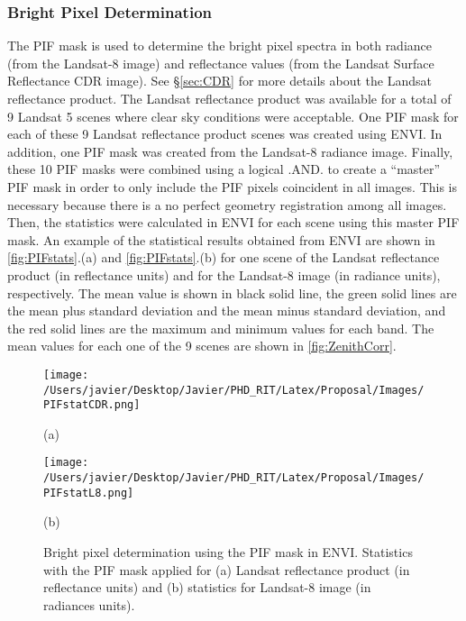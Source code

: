\subsubsection{Bright Pixel Determination}

The PIF mask is used to determine the bright pixel spectra in both radiance (from the Landsat-8 image) and reflectance values (from the Landsat Surface Reflectance CDR \cite{LandsatCDR} image). See \S\ref{sec:CDR} for more details about the Landsat reflectance product. The Landsat reflectance product was available for a total of 9 Landsat 5 scenes where clear sky conditions were acceptable. One PIF mask for each of these 9 Landsat reflectance product scenes was created using ENVI. In addition, one PIF mask was created from the Landsat-8 radiance image. Finally, these 10 PIF masks were combined using a logical .AND. to create a ``master'' PIF mask  in order to only include the PIF pixels coincident in all images. This is necessary because there is a no perfect geometry registration among all images. Then, the statistics were calculated in ENVI for each scene using this master PIF mask. An example of the statistical results obtained from ENVI are shown in \autoref{fig:PIFstats}.(a) and \autoref{fig:PIFstats}.(b) for one scene of the Landsat reflectance product (in reflectance units) and for the Landsat-8 image (in radiance units), respectively. The mean value is shown in black solid line, the green solid lines are the mean plus standard deviation and the mean minus standard deviation, and the red solid lines are the maximum and minimum values for each band. The mean values for each one of the 9 scenes are shown in \autoref{fig:ZenithCorr}. 

\begin{figure}[!ht]
  \begin{minipage}[c]{0.48\linewidth}
    \centering
      \texttt{[image: /Users/javier/Desktop/Javier/PHD\_RIT/Latex/Proposal/Images/PIFstatCDR.png]}  
    \centerline{(a)}\medskip
  \end{minipage}
  \hfill
  \begin{minipage}[d]{0.48\linewidth}
    \centering
      \texttt{[image: /Users/javier/Desktop/Javier/PHD\_RIT/Latex/Proposal/Images/PIFstatL8.png]}
    \centerline{(b)}\medskip
  \end{minipage}
  \caption{Bright pixel determination using the PIF mask in ENVI. Statistics with the PIF mask applied for (a) Landsat reflectance product (in reflectance units) and (b) statistics for Landsat-8 image (in radiances units). \label{fig:PIFstats} } 
\end{figure}

